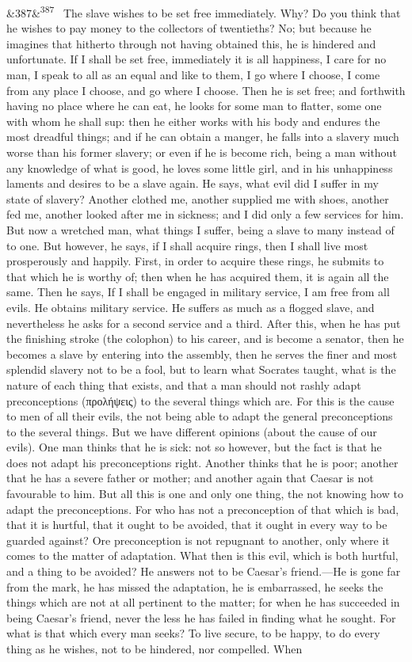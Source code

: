 \documentclass[12pt]{article}
\newcommand{\para}[1][]{\par\noindent\ifx&#1&\else\textsuperscript{\footnotesize #1}~\fi}
\begin{document}
\para[387] The slave wishes to be set free immediately. Why? Do you think that he wishes to pay money to the collectors of twentieths? No; but because he imagines that hitherto through not having obtained this, he is hindered and unfortunate. If I shall be set free, immediately it is all happiness, I care for no man, I speak to all as an equal and like to them, I go where I choose, I come from any place I choose, and go where I choose. Then he is set free; and forthwith having no place where he can eat, he looks for some man to flatter, some one with whom he shall sup: then he either works with his body and endures the most dreadful things; and if he can obtain a manger, he falls into a slavery much worse than his former slavery; or even if he is become rich, being a man without any knowledge of what is good, he loves some little girl, and in his unhappiness laments and desires to be a slave again. He says, what evil did I suffer in my state of slavery? Another clothed me, another supplied me with shoes, another fed me, another looked after me in sickness; and I did only a few services for him. But now a wretched man, what things I suffer, being a slave to many instead of to one. But however, he says, if I shall acquire rings, then I shall live most prosperously and happily. First, in order to acquire these rings, he submits to that which he is worthy of; then when he has acquired them, it is again all the same. Then he says, If I shall be engaged in military service, I am free from all evils. He obtains military service. He suffers as much as a flogged slave, and nevertheless he asks for a second service and a third. After this, when he has put the finishing stroke (the colophon) to his career, and is become a senator, then he becomes a slave by entering into the assembly, then he serves the finer and most splendid slavery not to be a fool, but to learn what Socrates taught, what is the nature of each thing that exists, and that a man should not rashly adapt preconceptions (προλήψεις) to the several things which are. For this is the cause to men of all their evils, the not being able to adapt the general preconceptions to the several things. But we have different opinions (about the cause of our evils). One man thinks that he is sick: not so however, but the fact is that he does not adapt his preconceptions right. Another thinks that he is poor; another that he has a severe father or mother; and another again that Caesar is not favourable to him. But all this is one and only one thing, the not knowing how to adapt the preconceptions. For who has not a preconception of that which is bad, that it is hurtful, that it ought to be avoided, that it ought in every way to be guarded against? Ore preconception is not repugnant to another, only where it comes to the matter of adaptation. What then is this evil, which is both hurtful, and a thing to be avoided? He answers not to be Caesar's friend.—He is gone far from the mark, he has missed the adaptation, he is embarrassed, he seeks the things which are not at all pertinent to the matter; for when he has succeeded in being Caesar's friend, never the less he has failed in finding what he sought. For what is that which every man seeks? To live secure, to be happy, to do every thing as he wishes, not to be hindered, nor compelled. When 
\end{document}
